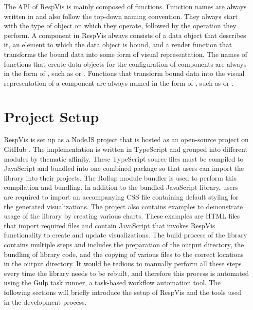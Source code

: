 The API of RespVis is mainly composed of functions.  Function names
are always written in  and also follow the top-down
naming convention.  They always start with the type of object on which
they operate, followed by the operation they perform.  A component in
RespVis always consists of a data object that describes it, an element
to which the data object is bound, and a render function that
transforms the bound data into some form of visual representation.
The names of functions that create data objects for the configuration
of components are always in the form of , such
as  or .  Functions that
transform bound data into the visual representation of a component are
always named in the form of , such as
 or .





\section{Project Setup}
\label{sec:ProjectSetup}

RespVis is set up as a NodeJS \parencite{NodeJS} project that is
hosted as an open-source project on GitHub \parencite{RespVisGitHub}.
The implementation is written in TypeScript and grouped into different
modules by thematic affinity.  These TypeScript source files must be
compiled to JavaScript and bundled into one combined package so that
users can import the library into their projects.  The Rollup module
bundler \parencite{Rollup} is used to perform this compilation and
bundling.  In addition to the bundled JavaScript library, users are
required to import an accompanying CSS file containing default styling
for the generated visualizations.  The project also contains examples
to demonstrate usage of the library by creating various charts.  These
examples are HTML files that import required files and contain
JavaScript that invokes RespVis functionality to create and update
visualizations.  The build process of the library contains multiple
steps and includes the preparation of the output directory, the
bundling of library code, and the copying of various files to the
correct locations in the output directory.  It would be tedious to
manually perform all these steps every time the library needs to be
rebuilt, and therefore this process is automated using the Gulp
\parencite{Gulp} task runner, a task-based workflow automation tool.
The following sections will briefly introduce the setup of RespVis and
the tools used in the development process.

